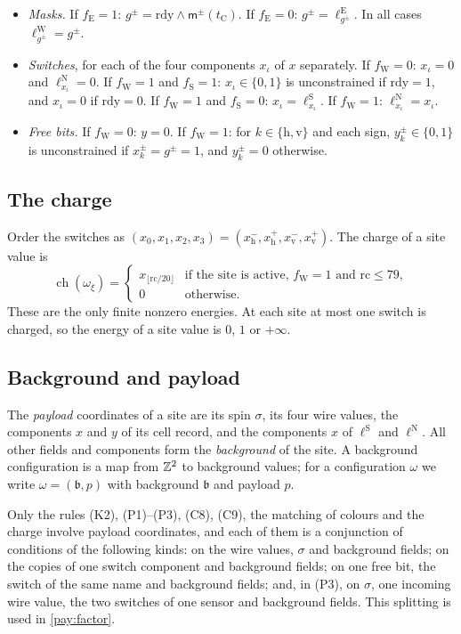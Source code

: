 \begin{itemize}
\item[(C7)] \emph{Masks.} If $f_{\mathrm E}=1$: $g^\pm=\mathrm{rdy}\wedge\mathsf m^\pm(t_{\mathrm C})$. If $f_{\mathrm E}=0$: $g^\pm=\ell^{\mathrm E}_{g^\pm}$. In all cases $\ell^{\mathrm W}_{g^\pm}=g^\pm$.
\item[(C8)] \emph{Switches}, for each of the four components $x_\iota$ of $x$ separately. If $f_{\mathrm W}=0$: $x_\iota=0$ and $\ell^{\mathrm N}_{x_\iota}=0$. If $f_{\mathrm W}=1$ and $f_{\mathrm S}=1$: $x_\iota\in\{0,1\}$ is unconstrained if $\mathrm{rdy}=1$, and $x_\iota=0$ if $\mathrm{rdy}=0$. If $f_{\mathrm W}=1$ and $f_{\mathrm S}=0$: $x_\iota=\ell^{\mathrm S}_{x_\iota}$. If $f_{\mathrm W}=1$: $\ell^{\mathrm N}_{x_\iota}=x_\iota$.
\item[(C9)] \emph{Free bits.} If $f_{\mathrm W}=0$: $y=0$. If $f_{\mathrm W}=1$: for $k\in\{\mathrm h,\mathrm v\}$ and each sign, $y^\pm_k\in\{0,1\}$ is unconstrained if $x^\pm_k=g^\pm=1$, and $y^\pm_k=0$ otherwise.
\end{itemize}

\subsection{The charge}\label{int:sub-charge}

Order the switches as $(x_0,x_1,x_2,x_3)=(x^-_{\mathrm h},x^+_{\mathrm h},x^-_{\mathrm v},x^+_{\mathrm v})$. The charge of a site value is
\[
\operatorname{ch}(\omega_\xi)=\begin{cases}x_{\lfloor\mathrm{rc}/20\rfloor}&\text{if the site is active, }f_{\mathrm W}=1\text{ and }\mathrm{rc}\le79,\\0&\text{otherwise.}\end{cases}
\]
These are the only finite nonzero energies. At each site at most one switch is charged, so the energy of a site value is $0$, $1$ or $+\infty$.

\subsection{Background and payload}\label{int:sub-split}

The \emph{payload} coordinates of a site are its spin $\sigma$, its four wire values, the components $x$ and $y$ of its cell record, and the components $x$ of $\ell^{\mathrm S}$ and $\ell^{\mathrm N}$. All other fields and components form the \emph{background} of the site. A background configuration is a map from $\mathbb{Z}^2$ to background values; for a configuration $\omega$ we write $\omega=(\mathfrak b,p)$ with background $\mathfrak b$ and payload $p$.

Only the rules (K2), (P1)--(P3), (C8), (C9), the matching of colours and the charge involve payload coordinates, and each of them is a conjunction of conditions of the following kinds: on the wire values, $\sigma$ and background fields; on the copies of one switch component and background fields; on one free bit, the switch of the same name and background fields; and, in (P3), on $\sigma$, one incoming wire value, the two switches of one sensor and background fields. This splitting is used in \cref{pay:factor}.
